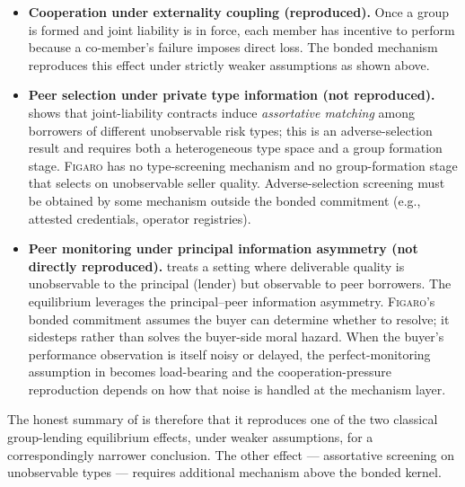 \documentclass[11pt,a4paper]{article}
\theoremstyle{definition}
\theoremstyle{remark}
\newcommand{\figaro}{\textsc{Figaro}}
\begin{document}
\begin{itemize}
  \item \textbf{Cooperation under externality coupling (reproduced).}
    Once a group is formed and joint liability is in force, each
    member has incentive to perform because a co-member's failure
    imposes direct loss. The bonded mechanism reproduces this
    effect under strictly weaker assumptions as shown above.

  \item \textbf{Peer selection under private type information (not
    reproduced).} \citet{ghatak1999} shows that joint-liability
    contracts induce \emph{assortative matching} among borrowers of
    different unobservable risk types; this is an adverse-selection
    result and requires both a heterogeneous type space and a group
    formation stage. \figaro{} has no type-screening mechanism and
    no group-formation stage that selects on unobservable seller
    quality. Adverse-selection screening must be obtained by some
    mechanism outside the bonded commitment (e.g., attested
    credentials, operator registries).

  \item \textbf{Peer monitoring under principal information asymmetry
    (not directly reproduced).} \citet{stiglitz1990} treats a
    setting where deliverable quality is unobservable to the
    principal (lender) but observable to peer borrowers. The
    equilibrium leverages the principal--peer information
    asymmetry. \figaro{}'s bonded commitment assumes the buyer can
    determine whether to resolve; it sidesteps rather than solves
    the buyer-side moral hazard. When the buyer's performance
    observation is itself noisy or delayed, the perfect-monitoring
    assumption in  becomes load-bearing and
    the cooperation-pressure reproduction depends on how that noise
    is handled at the mechanism layer.
\end{itemize}

The honest summary of  is therefore
that it reproduces one of the two classical group-lending equilibrium
effects, under weaker assumptions, for a correspondingly narrower
conclusion. The other effect --- assortative screening on
unobservable types --- requires additional mechanism above the
bonded kernel.
\end{document}
